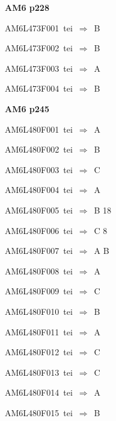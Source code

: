 \par\vfill\eject
{\bf\hfill AM6 p228\hfill\hbox{}}\par\bigskip
{\sixrm AM6L473F001\ {\sixit tei}\ }$\Rightarrow$\ B\par\smallskip
{\sixrm AM6L473F002\ {\sixit tei}\ }$\Rightarrow$\ B\par\smallskip
{\sixrm AM6L473F003\ {\sixit tei}\ }$\Rightarrow$\ A\par\smallskip
{\sixrm AM6L473F004\ {\sixit tei}\ }$\Rightarrow$\ B\par\smallskip

\par\vfill\eject
{\bf\hfill AM6 p245\hfill\hbox{}}\par\bigskip
{\sixrm AM6L480F001\ {\sixit tei}\ }$\Rightarrow$\ A\par\smallskip
{\sixrm AM6L480F002\ {\sixit tei}\ }$\Rightarrow$\ B\par\smallskip
{\sixrm AM6L480F003\ {\sixit tei}\ }$\Rightarrow$\ C\par\smallskip
{\sixrm AM6L480F004\ {\sixit tei}\ }$\Rightarrow$\ A\par\smallskip
{\sixrm AM6L480F005\ {\sixit tei}\ }$\Rightarrow$\ B 18\par\smallskip
{\sixrm AM6L480F006\ {\sixit tei}\ }$\Rightarrow$\ C 8\par\smallskip
{\sixrm AM6L480F007\ {\sixit tei}\ }$\Rightarrow$\ A B\par\smallskip
{\sixrm AM6L480F008\ {\sixit tei}\ }$\Rightarrow$\ A\par\smallskip
{\sixrm AM6L480F009\ {\sixit tei}\ }$\Rightarrow$\ C\par\smallskip
{\sixrm AM6L480F010\ {\sixit tei}\ }$\Rightarrow$\ B\par\smallskip
{\sixrm AM6L480F011\ {\sixit tei}\ }$\Rightarrow$\ A\par\smallskip
{\sixrm AM6L480F012\ {\sixit tei}\ }$\Rightarrow$\ C\par\smallskip
{\sixrm AM6L480F013\ {\sixit tei}\ }$\Rightarrow$\ C\par\smallskip
{\sixrm AM6L480F014\ {\sixit tei}\ }$\Rightarrow$\ A\par\smallskip
{\sixrm AM6L480F015\ {\sixit tei}\ }$\Rightarrow$\ B\par\smallskip

